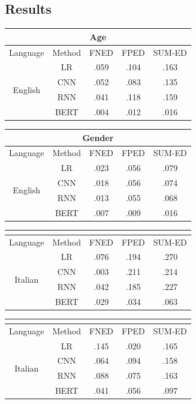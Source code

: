 \subsection{Results}

\begin{table}[htp]
\centering
\footnotesize
\begin{tabular}{cc|ccc}
\multicolumn{5}{c}{\textbf{Age}} \\\hline\hline
Language & Method & FNED & FPED & SUM-ED\\\hline
\multirow{4}{*}{English} & LR & .059 & .104 & .163\\
 & CNN  & .052 & .083 & .135 \\
 & RNN  & .041 & .118 & .159 \\
 & BERT & .004 & .012 & .016 
\end{tabular}
\quad
\begin{tabular}{cc|ccc}
\multicolumn{5}{c}{\textbf{Gender}} \\\hline\hline
Language & Method & FNED & FPED & SUM-ED \\\hline
\multirow{4}{*}{English} & LR & .023 & .056 & .079 \\
 & CNN  & .018 & .056 & .074 \\
 & RNN  & .013 & .055 & .068 \\
 & BERT & .007 & .009 & .016
\end{tabular}

\begin{tabular}{cc|ccc}
\multicolumn{5}{c}{} \\\hline\hline
Language & Method & FNED & FPED & SUM-ED \\\hline
\multirow{4}{*}{Italian} & LR & .076 & .194 & .270\\
 & CNN  & .003 & .211 & .214\\
 & RNN  & .042 & .185 & .227\\
 & BERT & .029 & .034 & .063
\end{tabular}
\quad
\begin{tabular}{cc|ccc}
\multicolumn{5}{c}{} \\\hline\hline
Language & Method & FNED & FPED & SUM-ED \\\hline
\multirow{4}{*}{Italian} & LR  & .145 & .020 & .165 \\
 & CNN  & .064 & .094 & .158 \\
 & RNN  & .088 & .075 & .163 \\
 & BERT & .041 & .056 & .097
\end{tabular}


\end{table}
